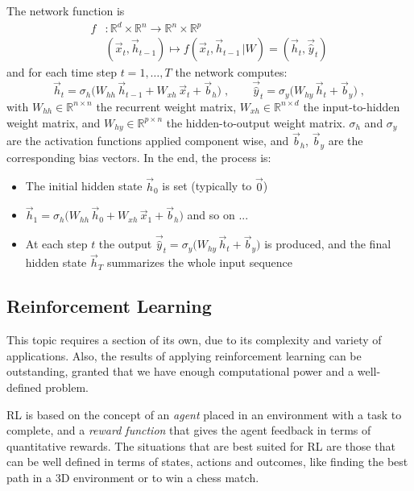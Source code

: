 \documentclass[12pt,a4paper]{article}
\begin{document}
The network function is
\begin{align*}
	f &: \mathbb{R}^d \times \mathbb{R}^n \to \mathbb{R}^n \times \mathbb{R}^p\\
	&(\vec{x}_t, \vec{h}_{t-1}) \mapsto f(\vec{x}_t, \vec{h}_{t-1} \,| W) = (\vec{h}_t, \vec{\hat{y}}_t)
\end{align*}
and for each time step $t=1,\ldots,T$ the network computes:
$$
\vec{h}_t = \sigma_h\big(W_{hh}\, \vec{h}_{t-1} + W_{xh}\, \vec{x}_t + \vec{b}_h\big)\;, \qquad
\vec{\hat{y}}_t = \sigma_y\big(W_{hy}\, \vec{h}_t + \vec{b}_y\big)\;,
$$
with $W_{hh}\in \mathbb{R}^{n\times n}$ the recurrent weight matrix, $W_{xh}\in \mathbb{R}^{n\times d}$ the input-to-hidden weight matrix, and $W_{hy}\in \mathbb{R}^{p\times n}$ the hidden-to-output weight matrix. $\sigma_h$ and $\sigma_y$ are the activation functions applied component wise, and $\vec{b}_h$, $\vec{b}_y$ are the corresponding bias vectors.
In the end, the process is:
\begin{itemize}
	\item[1.] The initial hidden state $\vec{h}_0$ is set (typically to $\vec{0}$)
	\item[2.] $\vec{h}_1 = \sigma_h\big(W_{hh}\, \vec{h}_0 + W_{xh}\, \vec{x}_1 + \vec{b}_h\big)$ and so on ...
	\item[3.] At each step $t$ the output $\vec{\hat{y}}_t = \sigma_y\big(W_{hy}\, \vec{h}_t + \vec{b}_y\big)$ is produced, and the final hidden state $\vec{h}_T$ summarizes the whole input sequence
\end{itemize}

\subsection{Reinforcement Learning}
This topic requires a section of its own, due to its complexity and variety of applications. Also, the results of applying reinforcement learning can be outstanding, granted that we have enough computational power and a well-defined problem.

RL is based on the concept of an \textit{agent} placed in an environment with a task to complete, and a \textit{reward function} that gives the agent feedback in terms of quantitative rewards. The situations that are best suited for RL are those that can be well defined in terms of states, actions and outcomes, like finding the best path in a 3D environment or to win a chess match.
\end{document}
